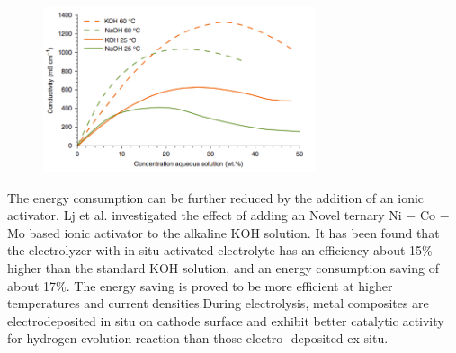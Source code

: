 \begin{figure}[H]
\centering
\includegraphics[width=8cm]{electrolytematerial.png}
\end{figure}
The energy consumption can be further reduced by the addition of an ionic activator. Lj et al. \cite{ionic}investigated the effect of adding an Novel ternary Ni $-$ Co $-$ Mo based ionic activator to the alkaline KOH solution. It has been found that the electrolyzer with in-situ activated electrolyte has an efficiency about 15\% higher than the standard KOH solution, and an energy consumption saving of about 17\%. The energy saving is proved to be more efficient at higher temperatures and current densities.During electrolysis, metal composites are electrodeposited in situ on cathode surface and exhibit better catalytic activity for hydrogen evolution reaction than those electro- deposited ex-situ. 

